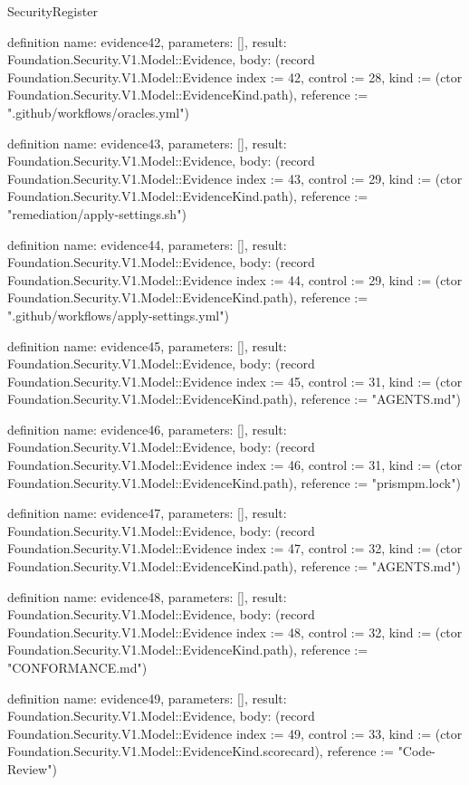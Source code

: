 \begin{lexlean}{SecurityRegister}
\begin{semanticmodule}
definition{
  name: evidence42,
  parameters: [],
  result: Foundation.Security.V1.Model::Evidence,
  body: (record Foundation.Security.V1.Model::Evidence {index := 42, control := 28, kind := (ctor Foundation.Security.V1.Model::EvidenceKind.path), reference := ".github/workflows/oracles.yml"})
}

definition{
  name: evidence43,
  parameters: [],
  result: Foundation.Security.V1.Model::Evidence,
  body: (record Foundation.Security.V1.Model::Evidence {index := 43, control := 29, kind := (ctor Foundation.Security.V1.Model::EvidenceKind.path), reference := "remediation/apply-settings.sh"})
}

definition{
  name: evidence44,
  parameters: [],
  result: Foundation.Security.V1.Model::Evidence,
  body: (record Foundation.Security.V1.Model::Evidence {index := 44, control := 29, kind := (ctor Foundation.Security.V1.Model::EvidenceKind.path), reference := ".github/workflows/apply-settings.yml"})
}

definition{
  name: evidence45,
  parameters: [],
  result: Foundation.Security.V1.Model::Evidence,
  body: (record Foundation.Security.V1.Model::Evidence {index := 45, control := 31, kind := (ctor Foundation.Security.V1.Model::EvidenceKind.path), reference := "AGENTS.md"})
}

definition{
  name: evidence46,
  parameters: [],
  result: Foundation.Security.V1.Model::Evidence,
  body: (record Foundation.Security.V1.Model::Evidence {index := 46, control := 31, kind := (ctor Foundation.Security.V1.Model::EvidenceKind.path), reference := "prismpm.lock"})
}

definition{
  name: evidence47,
  parameters: [],
  result: Foundation.Security.V1.Model::Evidence,
  body: (record Foundation.Security.V1.Model::Evidence {index := 47, control := 32, kind := (ctor Foundation.Security.V1.Model::EvidenceKind.path), reference := "AGENTS.md"})
}

definition{
  name: evidence48,
  parameters: [],
  result: Foundation.Security.V1.Model::Evidence,
  body: (record Foundation.Security.V1.Model::Evidence {index := 48, control := 32, kind := (ctor Foundation.Security.V1.Model::EvidenceKind.path), reference := "CONFORMANCE.md"})
}

definition{
  name: evidence49,
  parameters: [],
  result: Foundation.Security.V1.Model::Evidence,
  body: (record Foundation.Security.V1.Model::Evidence {index := 49, control := 33, kind := (ctor Foundation.Security.V1.Model::EvidenceKind.scorecard), reference := "Code-Review"})
}


\end{semanticmodule}
\end{lexlean}
